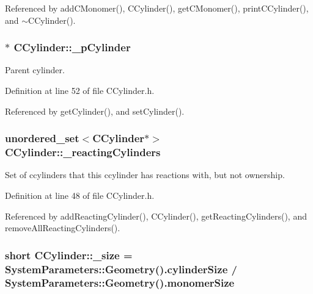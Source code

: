 Referenced by add\+C\+Monomer(), C\+Cylinder(), get\+C\+Monomer(), print\+C\+Cylinder(), and $\sim$\+C\+Cylinder().

\hypertarget{classCCylinder_a4439d9b805e3e206fd495540aa975346}{
\subsubsection[{\+\_\+p\+Cylinder}]{$\ast$ C\+Cylinder\+::\+\_\+p\+Cylinder\hspace{0.3cm}{\ttfamily [private]}}}\label{classCCylinder_a4439d9b805e3e206fd495540aa975346}


Parent cylinder. 



Definition at line 52 of file C\+Cylinder.\+h.



Referenced by get\+Cylinder(), and set\+Cylinder().

\hypertarget{classCCylinder_afdf5de084ef7692b8ee75b078eca384f}{
\subsubsection[{\+\_\+reacting\+Cylinders}]{\setlength{\rightskip}{0pt plus 5cm}unordered\+\_\+set$<${\bf C\+Cylinder}$\ast$$>$ C\+Cylinder\+::\+\_\+reacting\+Cylinders\hspace{0.3cm}{\ttfamily [private]}}}\label{classCCylinder_afdf5de084ef7692b8ee75b078eca384f}


Set of ccylinders that this ccylinder has reactions with, but not ownership. 



Definition at line 48 of file C\+Cylinder.\+h.



Referenced by add\+Reacting\+Cylinder(), C\+Cylinder(), get\+Reacting\+Cylinders(), and remove\+All\+Reacting\+Cylinders().

\hypertarget{classCCylinder_a9951ded0fd9d228a2358bee18f8b61b6}{
\subsubsection[{\+\_\+size}]{\setlength{\rightskip}{0pt plus 5cm}short C\+Cylinder\+::\+\_\+size = {\bf System\+Parameters\+::\+Geometry}().cylinder\+Size / {\bf System\+Parameters\+::\+Geometry}().monomer\+Size\hspace{0.3cm}{\ttfamily [private]}}}\label{classCCylinder_a9951ded0fd9d228a2358bee18f8b61b6}


